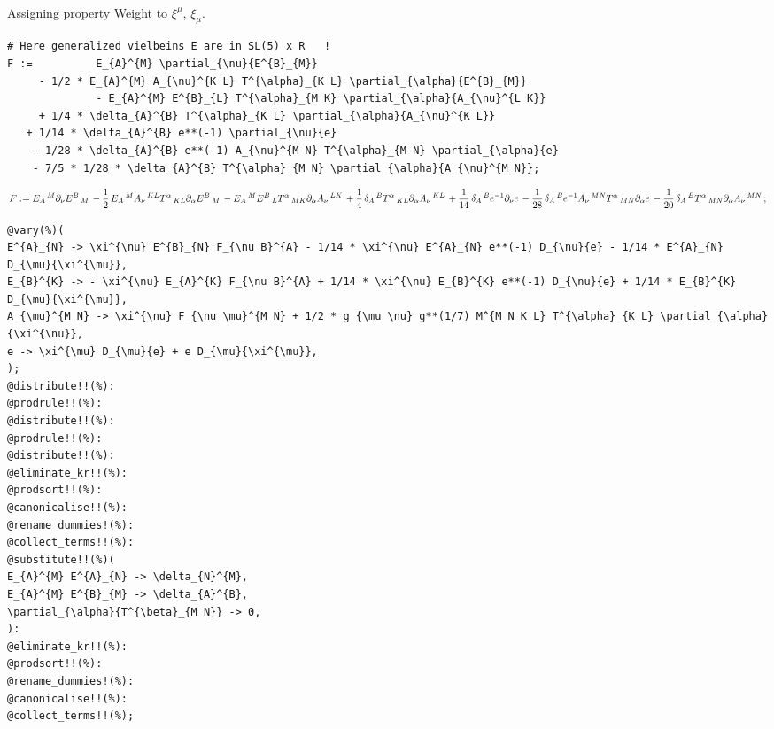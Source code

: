 \documentclass[11pt]{article}
\def\specialcolon{\mathrel{\mathop{:}}\hspace{-.5em}}
\begin{document}
\\
Assigning property Weight to ${\xi}^{\mu}$, ${\xi}_{\mu}$.
\\
{\color[named]{Blue}\begin{verbatim}
# Here generalized vielbeins E are in SL(5) x R   !
F :=          E_{A}^{M} \partial_{\nu}{E^{B}_{M}}
     - 1/2 * E_{A}^{M} A_{\nu}^{K L} T^{\alpha}_{K L} \partial_{\alpha}{E^{B}_{M}}
              - E_{A}^{M} E^{B}_{L} T^{\alpha}_{M K} \partial_{\alpha}{A_{\nu}^{L K}}
     + 1/4 * \delta_{A}^{B} T^{\alpha}_{K L} \partial_{\alpha}{A_{\nu}^{K L}}
   + 1/14 * \delta_{A}^{B} e**(-1) \partial_{\nu}{e}
    - 1/28 * \delta_{A}^{B} e**(-1) A_{\nu}^{M N} T^{\alpha}_{M N} \partial_{\alpha}{e}
    - 7/5 * 1/28 * \delta_{A}^{B} T^{\alpha}_{M N} \partial_{\alpha}{A_{\nu}^{M N}};
\end{verbatim}}
\begin{dmath*}[compact, spread=2pt]
F\specialcolon{}= {E}_{A}\,^{M} {\partial}_{\nu}{{E}^{B}\,_{M}}\,  - \frac{1}{2}\, {E}_{A}\,^{M} {A}_{\nu}\,^{K L} {T}^{\alpha}\,_{K L} {\partial}_{\alpha}{{E}^{B}\,_{M}}\,  - {E}_{A}\,^{M} {E}^{B}\,_{L} {T}^{\alpha}\,_{M K} {\partial}_{\alpha}{{A}_{\nu}\,^{L K}}\,  + \frac{1}{4}\, {\delta}_{A}\,^{B} {T}^{\alpha}\,_{K L} {\partial}_{\alpha}{{A}_{\nu}\,^{K L}}\,  + \frac{1}{14}\, {\delta}_{A}\,^{B} e{}^{-1} {\partial}_{\nu}{e}\,  - \frac{1}{28}\, {\delta}_{A}\,^{B} e{}^{-1} {A}_{\nu}\,^{M N} {T}^{\alpha}\,_{M N} {\partial}_{\alpha}{e}\,  - \frac{1}{20}\, {\delta}_{A}\,^{B} {T}^{\alpha}\,_{M N} {\partial}_{\alpha}{{A}_{\nu}\,^{M N}}\, ;
\end{dmath*}
{\color[named]{Blue}\begin{verbatim}
@vary(%)(
E^{A}_{N} -> \xi^{\nu} E^{B}_{N} F_{\nu B}^{A} - 1/14 * \xi^{\nu} E^{A}_{N} e**(-1) D_{\nu}{e} - 1/14 * E^{A}_{N} D_{\mu}{\xi^{\mu}},
E_{B}^{K} -> - \xi^{\nu} E_{A}^{K} F_{\nu B}^{A} + 1/14 * \xi^{\nu} E_{B}^{K} e**(-1) D_{\nu}{e} + 1/14 * E_{B}^{K} D_{\mu}{\xi^{\mu}},
A_{\mu}^{M N} -> \xi^{\nu} F_{\nu \mu}^{M N} + 1/2 * g_{\mu \nu} g**(1/7) M^{M N K L} T^{\alpha}_{K L} \partial_{\alpha}{\xi^{\nu}},
e -> \xi^{\mu} D_{\mu}{e} + e D_{\mu}{\xi^{\mu}},
);
@distribute!!(%):
@prodrule!!(%):
@distribute!!(%):
@prodrule!!(%):
@distribute!!(%):
@eliminate_kr!!(%):
@prodsort!!(%):
@canonicalise!!(%):
@rename_dummies!(%):
@collect_terms!!(%):
@substitute!!(%)(
E_{A}^{M} E^{A}_{N} -> \delta_{N}^{M},
E_{A}^{M} E^{B}_{M} -> \delta_{A}^{B},
\partial_{\alpha}{T^{\beta}_{M N}} -> 0,
):
@eliminate_kr!!(%):
@prodsort!!(%):
@rename_dummies!(%):
@canonicalise!!(%):
@collect_terms!!(%);
\end{verbatim}}
\end{document}
